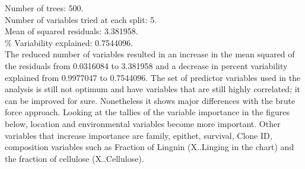 \documentclass{article}\usepackage[]{graphicx}\usepackage[]{color}
\begin{document}
Number of trees: 500.\\

Number of variables tried at each split: 5.\\

Mean of squared residuals: 3.381958. \\

\% Variability explained:  0.7544096.\\ 

The reduced number of variables resulted in an increase in the mean squared of the residuals from 0.0316084  to  3.381958 and a decrease in percent variability explained from  0.9977047   to    0.7544096.
The set of predictor variables used in the analysis is still not optimum and have variables that are still highly correlated; it can be improved for sure. Nonetheless it shows major differences with the brute force approach. Looking at the tallies of the variable importance in the figures below, location and environmental variables become more important. Other variables that increase importance are family, epithet, survival, Clone ID, composition variables such as Fraction of Lingnin (X..Linging in the chart) and the fraction of cellulose (X..Cellulose). \\
\end{document}
